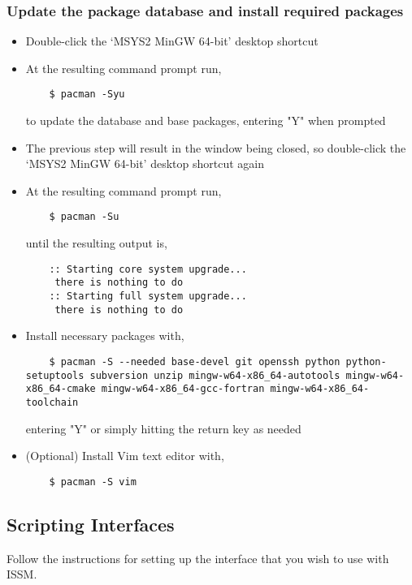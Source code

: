 \subsubsection{Update the package database and install required packages}
\begin{itemize}
	\item Double-click the `MSYS2 MinGW 64-bit' desktop shortcut
	\item At the resulting command prompt run, 

	\begin{lstlisting}
	$ pacman -Syu
	\end{lstlisting}

	to update the database and base packages, entering "Y" when prompted
	\item The previous step will result in the window being closed, so double-click the `MSYS2 MinGW 64-bit' desktop shortcut again
	\item At the resulting command prompt run,

	\begin{lstlisting}
	$ pacman -Su
	\end{lstlisting}

	until the resulting output is,

	\begin{lstlisting}
	:: Starting core system upgrade...
	 there is nothing to do
	:: Starting full system upgrade...
	 there is nothing to do
	\end{lstlisting}

	\item Install necessary packages with,

	\begin{lstlisting}
	$ pacman -S --needed base-devel git openssh python python-setuptools subversion unzip mingw-w64-x86_64-autotools mingw-w64-x86_64-cmake mingw-w64-x86_64-gcc-fortran mingw-w64-x86_64-toolchain
	\end{lstlisting}

	entering "Y" or simply hitting the return key as needed
	\item (Optional) Install Vim text editor with,

	\begin{lstlisting}
	$ pacman -S vim
	\end{lstlisting}
\end{itemize}

\subsection{Scripting Interfaces}
Follow the instructions for setting up the interface that you wish to use with ISSM.


